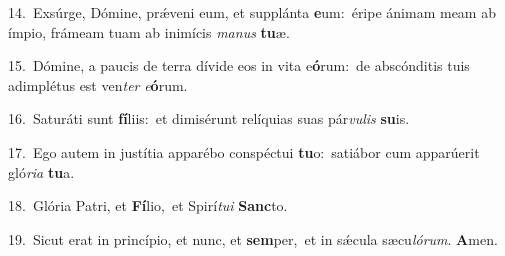 {\numbfont\textcolor{\numbcolor}{14.}}~Exsúrge, Dómine, prǽveni eum, et supplánta \textbf{e}\-um:~\star éripe ánimam meam ab ímpio, frámeam tuam ab inimícis \textit{ma}\-\textit{nus} \textbf{tu}\-æ.\par
{\numbfont\textcolor{\numbcolor}{15.}}~Dómine, a paucis de terra dívide eos in vita e\-\textbf{ó}\-rum:~\star de abscónditis tuis adimplétus est ven\textit{ter} \textit{e}\-\textbf{ó}rum.\par
{\numbfont\textcolor{\numbcolor}{16.}}~Saturáti sunt \textbf{fí}\-liis:~\star et dimisérunt relíquias suas pár\-\textit{vu}\-\textit{lis} \textbf{su}\-is.\par
{\numbfont\textcolor{\numbcolor}{17.}}~Ego autem in justítia apparébo conspéctui \textbf{tu}\-o:~\star satiábor cum apparúerit gló\-\textit{ri}\-\textit{a} \textbf{tu}\-a.\par
{\numbfont\textcolor{\numbcolor}{18.}}~Glória Patri, et \textbf{Fí}\-lio,~\star et Spirí\-\textit{tu}\-\textit{i} \textbf{Sanc}\-to.\par
{\numbfont\textcolor{\numbcolor}{19.}}~Sicut erat in princípio, et nunc, et \textbf{sem}\-per,~\star et in sǽcula sæcu\-\textit{ló}\-\textit{rum}. \textbf{A}\-men.\par
